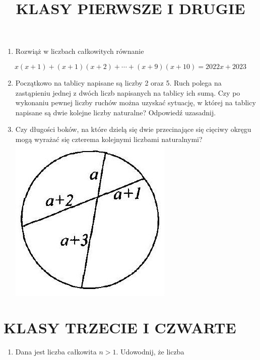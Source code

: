 \documentclass[10pt]{article}
\title{KLASY PIERWSZE I DRUGIE }
\author{}
\date{}
\begin{document}
\maketitle
\begin{enumerate}
  \item Rozwiąż w liczbach całkowitych równanie
\end{enumerate}

\[
x(x+1)+(x+1)(x+2)+\cdots+(x+9)(x+10)=2022 x+2023
\]

\begin{enumerate}
  \setcounter{enumi}{1}
  \item Początkowo na tablicy napisane są liczby 2 oraz 5. Ruch polega na zastąpieniu jednej z dwóch liczb napisanych na tablicy ich sumą. Czy po wykonaniu pewnej liczby ruchów można uzyskać sytuację, w której na tablicy napisane są dwie kolejne liczby naturalne? Odpowiedź uzasadnij.
  \item Czy długości boków, na które dzielą się dwie przecinające się cięciwy okręgu mogą wyrażać się czterema kolejnymi liczbami naturalnymi?\\
\includegraphics[max width=\textwidth, center]{2024_11_21_b929c47ff1092b2cac26g-1}
\end{enumerate}

\section*{KLASY TRZECIE I CZWARTE}
\begin{enumerate}
  \item Dana jest liczba całkowita \(n>1\). Udowodnij, że liczba
\end{enumerate}
\end{document}
